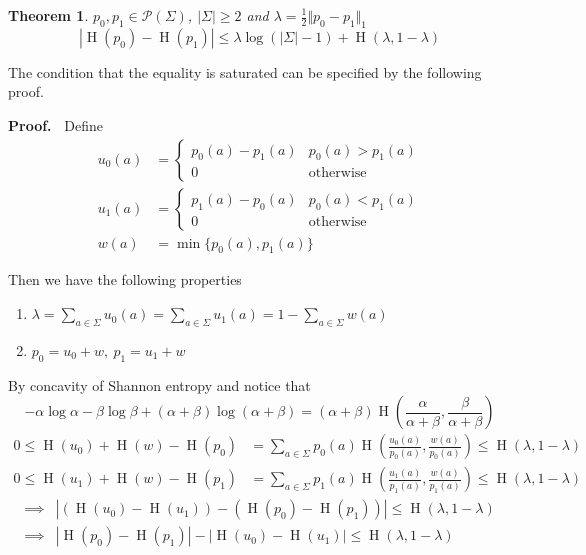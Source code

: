 \documentclass[aps,pra,onecolumn,notitlepage,superscriptaddress]{revtex4-1}
\newcommand{\spc}[1]{\mathcal{#1}}
\newcommand{\op}[1]{\operatorname{#1}}
\newtheorem{theo}{Theorem}
\def\Proof{{\bf Proof.~}}
\begin{document}
    
    \begin{theo}
        $p_0, p_1 \in \spc P(\Sigma)$, $|\Sigma| \geq 2$ and $\lambda = \frac{1}{2} \Vert p_0 - p_1 \Vert_1$
        \begin{equation}
            |\op H(p_0) - \op H(p_1)| \leq \lambda \log (|\Sigma|-1) + \op H(\lambda, 1-\lambda)
        \end{equation}
    \end{theo}
    The condition that the equality is saturated can be specified by the following proof.

    \Proof
    Define
    \begin{align}
        u_0(a) &= \begin{cases}
            p_0(a) - p_1(a) & p_0(a) > p_1(a) \\
            0 & \text{otherwise}
        \end{cases} \\
        u_1(a) &= \begin{cases}
            p_1(a) - p_0(a) & p_0(a) < p_1(a) \\
            0 & \text{otherwise}
        \end{cases} \\
        w(a) &= \min \{ p_0(a), p_1(a) \}
    \end{align}

    Then we have the following properties
    \begin{enumerate}
        \item $\lambda = \sum_{a \in \Sigma} u_0(a) = \sum_{a \in \Sigma} u_1(a) = 1 - \sum_{a \in \Sigma} w(a)$
        \item $p_0 = u_0 + w, \ p_1 = u_1 + w$
    \end{enumerate}

    By concavity of Shannon entropy and notice that
    \begin{equation}
        -\alpha \log \alpha - \beta \log \beta + (\alpha+\beta) \log (\alpha+\beta) = (\alpha+\beta) \op H\left( 
            \frac{\alpha}{\alpha+\beta},     
            \frac{\beta}{\alpha+\beta}
        \right)
    \end{equation}
    \begin{align*}
        0 \leq \op H(u_0) + \op H(w) - \op H(p_0) &= \sum_{a \in \Sigma} p_0(a) \op H \left(\frac{u_0(a)}{p_0(a)}, \frac{w(a)}{p_0(a)} \right) \leq \op H(\lambda, 1-\lambda) \\
        0 \leq \op H(u_1) + \op H(w) - \op H(p_1) &= \sum_{a \in \Sigma} p_1(a) \op H \left(\frac{u_1(a)}{p_1(a)}, \frac{w(a)}{p_1(a)} \right) \leq \op H(\lambda, 1-\lambda)
    \end{align*}
    \begin{align*}
        \implies& |(\op H(u_0) - \op H(u_1)) - (\op H(p_0) - \op H(p_1))| \leq \op H(\lambda, 1-\lambda) \\
        \implies& |\op H(p_0) - \op H(p_1)| - |\op H(u_0) - \op H(u_1)| \leq \op H(\lambda, 1-\lambda) \\
    \end{align*}
\end{document}
